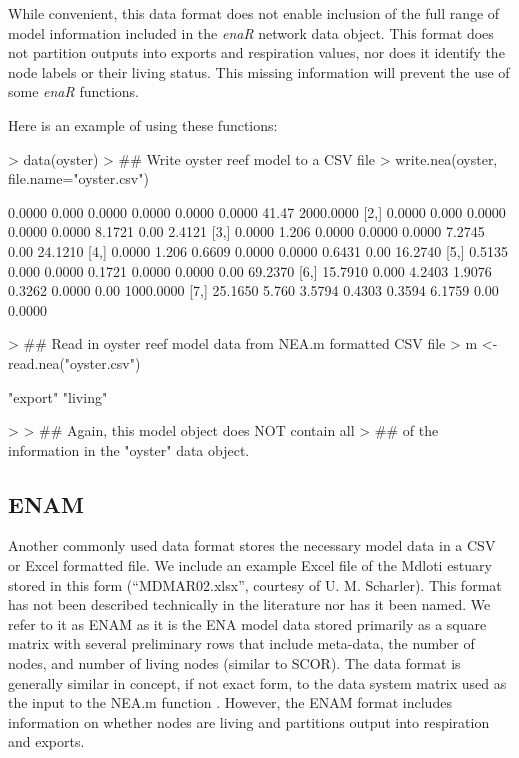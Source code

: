 \documentclass[article]{jss}
\begin{document}
While convenient, this data format does not enable inclusion of the
full range of model information included in the \textit{enaR} network
data object.  This format does not partition outputs into exports and
respiration values, nor does it identify the node labels or their
living status. This missing information will prevent the use of some
\textit{enaR} functions.

Here is an example of using these functions:
\begin{Schunk}
\begin{Sinput}
> data(oyster)
> ## Write oyster reef model to a CSV file
> write.nea(oyster, file.name="oyster.csv")
\end{Sinput}
\begin{Soutput}
        [,1]  [,2]   [,3]   [,4]   [,5]   [,6]  [,7]      [,8]
[1,]  0.0000 0.000 0.0000 0.0000 0.0000 0.0000 41.47 2000.0000
[2,]  0.0000 0.000 0.0000 0.0000 0.0000 8.1721  0.00    2.4121
[3,]  0.0000 1.206 0.0000 0.0000 0.0000 7.2745  0.00   24.1210
[4,]  0.0000 1.206 0.6609 0.0000 0.0000 0.6431  0.00   16.2740
[5,]  0.5135 0.000 0.0000 0.1721 0.0000 0.0000  0.00   69.2370
[6,] 15.7910 0.000 4.2403 1.9076 0.3262 0.0000  0.00 1000.0000
[7,] 25.1650 5.760 3.5794 0.4303 0.3594 6.1759  0.00    0.0000
\end{Soutput}
\begin{Sinput}
> ## Read in oyster reef model data from NEA.m formatted CSV file
> m <- read.nea("oyster.csv")
\end{Sinput}
\begin{Soutput}
[1] "export" "living"
\end{Soutput}
\begin{Sinput}
> 
> ## Again, this model object does NOT contain all
> ## of the information in the "oyster" data object.
\end{Sinput}
\end{Schunk}

\subsection*{ENAM}

Another commonly used data format stores the necessary model data in a
CSV or Excel formatted file.  We include an example Excel file of the
Mdloti estuary stored in this form (``MDMAR02.xlsx'', courtesy
of U. M. Scharler).  This format has not been described technically in
the literature nor has it been named.  We refer to it as ENAM as it is
the ENA model data stored primarily as a square matrix with several
preliminary rows that include meta-data, the number of nodes, and
number of living nodes (similar to SCOR).  The data format is
generally similar in concept, if not exact form, to the data system
matrix used as the input to the NEA.m function \citep{fath06}.
However, the ENAM format includes information on whether nodes are
living and partitions output into respiration and exports.
\end{document}
